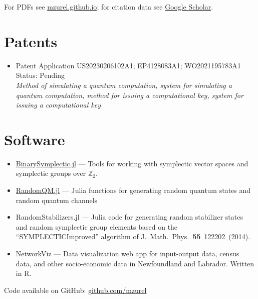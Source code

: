 \documentclass[letterpaper,11pt]{article}
\newcommand{\ConferenceItem}[3]{
	\item{\parbox{0.97\textwidth}{
		{#1}  \hfill {#2}\\
		\emph{#3}
	}}
}
\begin{document}
\nocite{ZurelRaussendorf2023,ZurelHeimendahl2024b,ZurelHeimendahl2024a,ZurelCohenRaussendorf2023,RaussendorfFeldmann2023,OkayRaussendorf2021,ZurelRaussendorf2020,RaussendorfZurel2020}
\printbibliography[title={Publications \& preprints}]
For PDFs see \href{mzurel.github.io}{mzurel.github.io}; for citation data see \href{https://scholar.google.com/citations?user=qUA_szUAAAAJ&hl=en&oi=ao}{Google Scholar}.


\section*{Patents}
\begin{itemize}[leftmargin=*]
	\ConferenceItem{Patent Application US20230206102A1; EP4128083A1; WO2021195783A1}{Status: Pending}{Method of simulating a quantum computation, system for simulating a quantum computation, method for issuing a computational key, system for issuing a computational key}
\end{itemize}


\section*{Software}
\begin{itemize}[leftmargin=*]
	\item \href{https://github.com/mzurel/BinarySymplectic.jl}{BinarySymplectic.jl} --- Tools for working with symplectic vector spaces and symplectic groups over $\mathbb{Z}_2$.
	\vspace{-4pt}
	\item \href{https://github.com/mzurel/RandomQM.jl}{RandomQM.jl} --- Julia functions for generating random quantum states and random quantum channels
	\vspace{-4pt}
	\item %
	RandomStabilizers.jl --- Julia code for generating random stabilizer states and random symplectic group elements based on the ``SYMPLECTICImproved'' algorithm of J.~Math.~Phys.~\textbf{55}~122202~(2014).
	\vspace{-4pt}
	\item NetworkViz --- Data visualization web app for input-output data, census data, and other socio-economic data in Newfoundland and Labrador.  Written in R.
	\vspace{-4pt}
\end{itemize}
Code available on GitHub: \href{https://github.com/mzurel}{github.com/mzurel}
\end{document}
